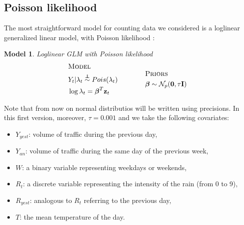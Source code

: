 \documentclass[11pt,twoside]{report}
\newcommand\independent{\protect\mathpalette{\protect\independenT}{\perp}}
\def\independenT#1#2{\mathrel{\rlap{$#1#2$}\mkern2mu{#1#2}}}
\newtheorem{model}{Model}
\begin{document}
\subsection{Poisson likelihood}
The most straightforward model for counting data we considered is a loglinear generalized linear model, with Poisson likelihood :
\begin{model} Loglinear GLM with Poisson likelihood\\
	\begin{equation*}
	\begin{aligned}
	&\textsc{Model}\\
	&Y_t  |  \lambda_t \overset{\independent}{\sim} Pois(\lambda_t)\\
	&\log{\lambda_t} = \boldsymbol{\beta}^T\mathbf{z}_t\\
	\end{aligned}
	\qquad \qquad
	\begin{aligned}[c]
	&\textsc{Priors}\\
	&\boldsymbol{\beta} \sim \mathcal{N}_p(\mathbf{0}, \tau \mathbf{I})
	\end{aligned}
	\end{equation*}
\end{model}
Note that from now on normal distributios will be written using precisions. In this first version, moreover, $ \tau=0.001 $ and we take the following covariates:
\begin{itemize}
	\item $Y_{yest}$: volume of traffic during the previous day,
	\item $Y_{an}$: volume of traffic during the same day of the previous week,
	\item $W$: a binary variable representing weekdays or weekends, 
	\item $R_t$: a discrete variable representing the intensity of the rain (from 0 to 9),
	\item $R_{yest}$: analogous to $R_t$ referring to the previous day,
	\item $T$: the mean temperature of the day.
\end{itemize}  
\end{document}
